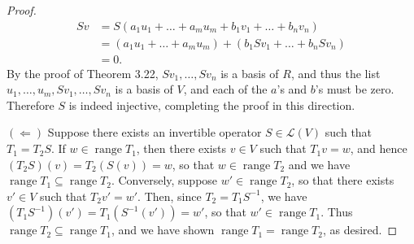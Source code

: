 \documentclass{extarticle}
\newcommand{\Hom}{\mathcal{L}}
\DeclareMathOperator{\Range}{range}
\begin{document}
\begin{proof}
\begin{align*}
Sv &= S(a_1u_1 + \dots + a_mu_m + b_1v_1 + \dots + b_nv_n)\\
&= (a_1u_1 + \dots + a_mu_m) + (b_1Sv_1 + \dots + b_nSv_n)\\
&= 0.
\end{align*}
By the proof of Theorem 3.22, $Sv_1,\dots, Sv_n$ is a basis of $R$, and thus the list $u_1,\dots, u_m, Sv_1,\dots, Sv_n$ is a basis of $V$, and each of the $a$'s and $b$'s must be zero.  Therefore $S$ is indeed injective, completing the proof in this direction.
\par $(\Leftarrow)$ Suppose there exists an invertible operator $S\in\Hom(V)$ such that $T_1 = T_2S$.  If $w\in\Range T_1$, then there exists $v\in V$ such that $T_1v = w$, and hence $(T_2S)(v) = T_2(S(v)) = w$, so that $w\in\Range T_2$ and we have $\Range T_1\subseteq \Range T_2$.  Conversely, suppose $w'\in\Range T_2$, so that there exists $v'\in V$ such that $T_2v' = w'$.  Then, since $T_2 = T_1S^{-1}$, we have $(T_1S^{-1})(v') = T_1(S^{-1}(v')) = w'$, so that $w'\in\Range T_1$.  Thus $\Range T_2\subseteq\Range T_1$, and we have shown $\Range T_1 = \Range T_2$, as desired.
\end{proof}
\end{document}
